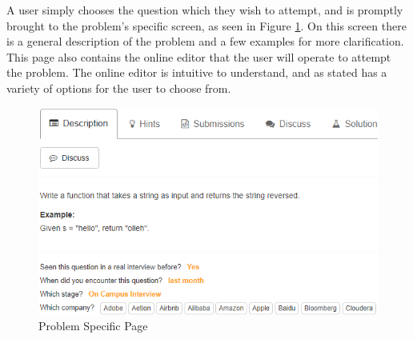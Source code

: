 \documentclass[10pt,twocolumn,hidelinks]{IEEEtran}
\begin{document}
A user simply chooses the question which they wish to attempt, and is promptly brought to the problem's specific screen, as seen in Figure \ref{fig:problemPage}. On this screen there is a general description of the problem and a few examples for more clarification. This page also contains the online editor that the user will operate to attempt the problem. The online editor is intuitive to understand, and as stated has a variety of options for the user to choose from. 
\begin{figure}[h]
\includegraphics[scale=0.4]{problemPage.png}
\caption{Problem Specific Page}
\label{fig:problemPage}
\end{figure}
\end{document}
